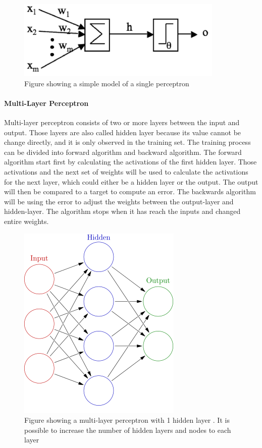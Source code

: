 \documentclass[USenglish]{ifimaster}  %
\begin{document}
	
	\begin{figure}[h]
		\centering
		\includegraphics[scale=0.9]{Figures/neuron.PNG}
		\caption{Figure showing a simple model of a single perceptron \cite{Marsland:2009:MLA:1571643}}
		\label{fig:NN}
	\end{figure}
	
	\paragraph{Multi-Layer Perceptron}
	Multi-layer perceptron consists of two or more layers between the input and output. Those layers are also called hidden layer because its value cannot be change directly, and it is only observed in the training set. The training process can be divided into forward algorithm and backward algorithm. The forward algorithm start first by calculating the activations of the first hidden layer. Those activations and the next set of weights will be used to calculate the activations for the next layer, which could either be a hidden layer or the output. The output will then be compared to a target to compute an error. The backwards algorithm will be using the error to adjust the weights between the output-layer and hidden-layer. The algorithm stops when it has reach the inputs and changed entire weights.
	
	
	\begin{figure}[h]
		\centering
		\includegraphics[scale=0.6]{Figures/MLP.png}
		\caption{Figure showing a multi-layer perceptron with 1 hidden layer \cite{MLP}. It is possible to increase the number of hidden layers and nodes to each layer}
		\label{fig:MLP}
	\end{figure}
	
\end{document}
